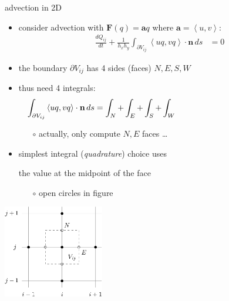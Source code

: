 \documentclass[10pt,dvipsnames,usepdftitle=false,
hyperref={pdftitle = {Finite volume methods},
    pdfauthor = {Ed Bueler}}]{beamer}
\newcommand{\ba}{\mathbf{a}}
\newcommand{\bn}{\mathbf{n}}
\newcommand{\bF}{\mathbf{F}}
\begin{document}
\begin{frame}{advection in 2D}

\begin{itemize}
\item consider advection with $\bF(q) = \ba q$ where $\ba = \left<u,v\right>$:
\begin{align*}
\frac{dQ_{ij}}{dt} + \frac{1}{h_x h_y} \int_{\partial V_{ij}} \left<uq,vq\right> \cdot \bn \,ds &= 0
\end{align*}
\item the boundary $\partial V_{ij}$ has 4 sides (faces) $N,E,S,W$
\item thus need 4 integrals:
    $$\int_{\partial V_{ij}} \left<uq,vq\right> \cdot \bn \,ds = \int_N + \int_E + \int_S + \int_W \hspace{50mm}$$

    \begin{itemize}
    \item[$\circ$] actually, only compute $N,E$ faces \dots
    \end{itemize}

\item simplest integral (\emph{quadrature}) choice uses

the value at the midpoint of the face

    \begin{itemize}
    \item[$\circ$] open circles in figure
    \end{itemize}
\end{itemize}

\vspace{-35mm}
\hfill \includegraphics[width=0.33\textwidth]{figs/bueler11p8facemidpoints}
\end{frame}
\end{document}
